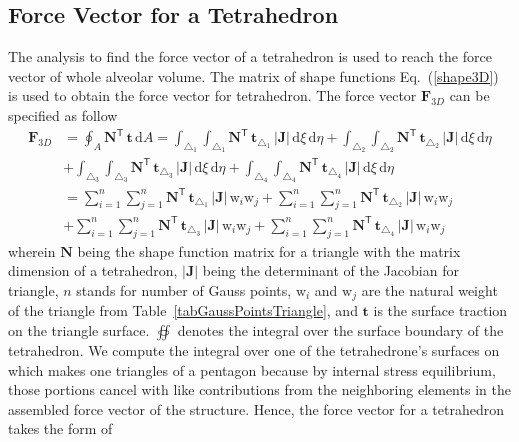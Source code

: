 \subsection{Force Vector for a Tetrahedron}

The analysis to find the force vector of a tetrahedron is used to reach the force vector of whole alveolar volume.
The matrix of shape functions Eq.~(\ref{shape3D}) is used to obtain the force vector for tetrahedron.
The force vector $\mathbf{F}_{3D}$ can be specified as follow
\begin{equation}
\begin{aligned}
\mathbf{F}_{3D} &= \oint_{A} \mathbf{N}^{\mathsf{T}} \, \mathbf{t} \, \mathrm{d} A = \int_{\triangle_{1}} \int_{\triangle_{1}} \mathbf{N}^{\mathsf{T}} \, \mathbf{t}_{\triangle_{1}} \,|\mathbf{J}| \, \mathrm{d} \xi \, \mathrm{d} \eta  + \int_{\triangle_{2}} \int_{\triangle_{2}} \mathbf{N}^{\mathsf{T}} \, \mathbf{t}_{\triangle_{2}} \,|\mathbf{J}| \, \mathrm{d} \xi \, \mathrm{d} \eta \\
& + \int_{\triangle_{3}} \int_{\triangle_{3}} \mathbf{N}^{\mathsf{T}} \, \mathbf{t}_{\triangle_{3}} \,|\mathbf{J}| \, \mathrm{d} \xi \, \mathrm{d} \eta + \int_{\triangle_{4}} \int_{\triangle_{4}} \mathbf{N}^{\mathsf{T}} \, \mathbf{t}_{\triangle_{4}} \,|\mathbf{J}| \, \mathrm{d} \xi \, \mathrm{d} \eta \\
 & = \sum_{i=1}^{n} \sum_{j=1}^{n} \mathbf{N}^{\mathsf{T}} \, \mathbf{t}_{\triangle_{1}} \,|\mathbf{J}| \, \mathrm{w}_i \mathrm{w}_j + \sum_{i=1}^{n} \sum_{j=1}^{n} \mathbf{N}^{\mathsf{T}} \, \mathbf{t}_{\triangle_{2}} \,|\mathbf{J}| \, \mathrm{w}_i \mathrm{w}_j \\
 & + \sum_{i=1}^{n} \sum_{j=1}^{n} \mathbf{N}^{\mathsf{T}} \, \mathbf{t}_{\triangle_{3}} \,|\mathbf{J}| \, \mathrm{w}_i \mathrm{w}_j + \sum_{i=1}^{n} \sum_{j=1}^{n} \mathbf{N}^{\mathsf{T}} \, \mathbf{t}_{\triangle_{4}} \,|\mathbf{J}| \, \mathrm{w}_i \mathrm{w}_j
 \end{aligned}
\end{equation}
wherein $ \mathbf{N}$ being the shape function matrix for a triangle with the matrix dimension of a tetrahedron,  $|\mathbf{J}|$ being the determinant of the Jacobian for triangle, $n$ stands for number of Gauss points, $\mathrm{w}_i$ and $\mathrm{w}_j$ are the natural weight of the triangle from Table~\ref{tabGaussPointsTriangle}, and $\mathbf{t}$ is the surface traction on the triangle surface. $\oiint$ denotes the integral over the surface boundary of the tetrahedron. We compute the integral over one of the tetrahedrone's surfaces on which makes one triangles of a pentagon because by internal stress equilibrium, those portions cancel with like contributions from the neighboring elements in the assembled force vector of the structure. Hence, the force vector for a tetrahedron takes the form of

